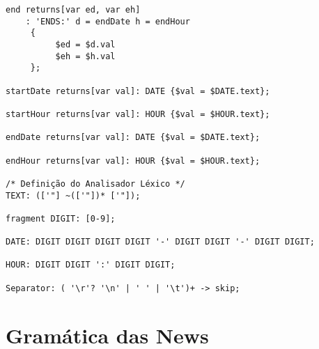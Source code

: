 \begin{lstlisting}[language=ANTLR]
end returns[var ed, var eh]
	: 'ENDS:' d = endDate h = endHour 
     {
          $ed = $d.val
          $eh = $h.val
     };

startDate returns[var val]: DATE {$val = $DATE.text};

startHour returns[var val]: HOUR {$val = $HOUR.text};

endDate returns[var val]: DATE {$val = $DATE.text};

endHour returns[var val]: HOUR {$val = $HOUR.text};

/* Definição do Analisador Léxico */
TEXT: (['"] ~(['"])* ['"]);

fragment DIGIT: [0-9];

DATE: DIGIT DIGIT DIGIT DIGIT '-' DIGIT DIGIT '-' DIGIT DIGIT;

HOUR: DIGIT DIGIT ':' DIGIT DIGIT;

Separator: ( '\r'? '\n' | ' ' | '\t')+ -> skip; 
\end{lstlisting}

\newpage
\section{Gramática das News} \label{GN}

